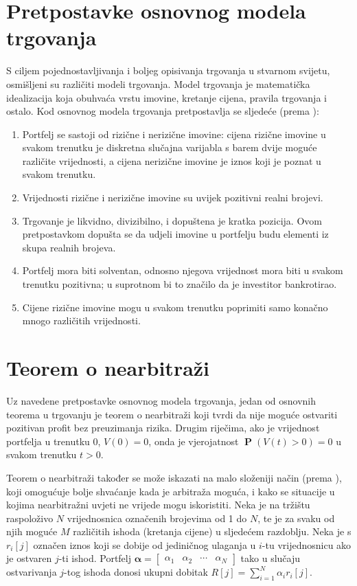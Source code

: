 \documentclass[lmodern, utf8, diplomski, numeric]{fer}
\newcommand{\matr}[1]{\mathbold{#1}}
\newcommand{\prob}[1]{\operatorname{\mathbf{P}}\q(#1\w)}
\newcommand{\q}{\left}
\newcommand{\w}{\right}
\begin{document}
  \section{Pretpostavke osnovnog modela trgovanja}
  S ciljem pojednostavljivanja i boljeg opisivanja trgovanja u stvarnom svijetu, osmišljeni su različiti modeli trgovanja.
  Model trgovanja je matematička idealizacija koja obuhvaća vrstu imovine, kretanje cijena, pravila trgovanja i ostalo.
  Kod osnovnog modela trgovanja pretpostavlja se sljedeće (prema \citep{finmat}):
  \begin{enumerate}
    \item Portfelj se sastoji od rizične i nerizične imovine: cijena rizične imovine u svakom trenutku je diskretna slučajna varijabla s barem dvije moguće različite vrijednosti, a cijena nerizične imovine je iznos koji je poznat u svakom trenutku.
    
    \item Vrijednosti rizične i nerizične imovine su uvijek pozitivni realni brojevi.
    
    \item Trgovanje je likvidno, divizibilno, i dopuštena je kratka pozicija.
    Ovom pretpostavkom dopušta se da udjeli imovine u portfelju budu elementi iz skupa realnih brojeva.
    
    \item Portfelj mora biti solventan, odnosno njegova vrijednost mora biti u svakom trenutku pozitivna; u suprotnom bi to značilo da je investitor bankrotirao.
    
    \item Cijene rizične imovine mogu u svakom trenutku poprimiti samo konačno mnogo različitih vrijednosti.
  \end{enumerate}
  
  \section{Teorem o nearbitraži}
  Uz navedene pretpostavke osnovnog modela trgovanja, jedan od osnovnih teorema u trgovanju je teorem o nearbitraži koji tvrdi da nije moguće ostvariti pozitivan profit bez preuzimanja rizika.
  Drugim riječima, ako je vrijednost portfelja u trenutku 0, $V\q(0\w) = 0$, onda je vjerojatnost $\prob{V\q(t\w) > 0} = 0$ u svakom trenutku $t > 0$.
  
  Teorem o nearbitraži također se može iskazati na malo složeniji način (prema \citep{ross2011elementary}), koji omogućuje bolje shvaćanje kada je arbitraža moguća, i kako se situacije u kojima nearbitražni uvjeti ne vrijede mogu iskoristiti.
  Neka je na tržištu raspoloživo $N$ vrijednosnica označenih brojevima od 1 do $N$, te je za svaku od njih moguće $M$ različitih ishoda (kretanja cijene) u sljedećem razdoblju.
  Neka je s $r_i\q[j\w]$ označen iznos koji se dobije od jediničnog ulaganja u $i$-tu vrijednosnicu ako je ostvaren $j$-ti ishod.
  Portfelj $\matr{\alpha} = \begin{bmatrix} \alpha_1 & \alpha_2 & \cdots & \alpha_N
  \end{bmatrix}$ tako u slučaju ostvarivanja $j$-tog ishoda donosi ukupni dobitak $R\q[j\w] = \sum_{i=1}^{N} \alpha_i r_i \q[j\w]$.
  
\end{document}
